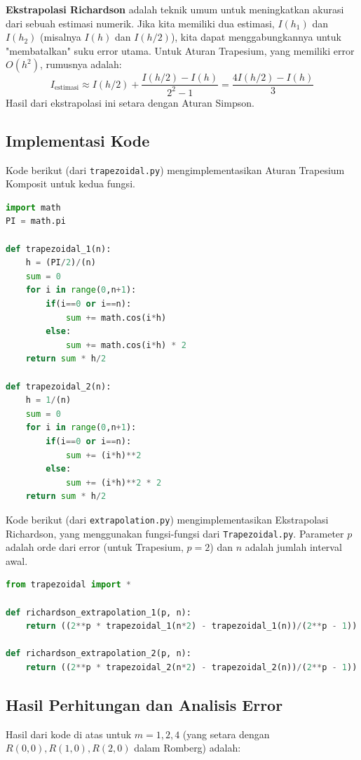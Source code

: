 \documentclass[a4paper, 11pt]{article} %
\begin{document}
\textbf{Ekstrapolasi Richardson} adalah teknik umum untuk meningkatkan akurasi dari sebuah estimasi numerik. %
Jika kita memiliki dua estimasi, $I(h_1)$ dan $I(h_2)$ (misalnya $I(h)$ dan $I(h/2)$), kita dapat menggabungkannya untuk "membatalkan" suku error utama. %
Untuk Aturan Trapesium, yang memiliki error $O(h^2)$, rumusnya adalah: %
\[ I_{\text{estimasi}} \approx I(h/2) + \frac{I(h/2) - I(h)}{2^2 - 1} = \frac{4 I(h/2) - I(h)}{3} \] %
Hasil dari ekstrapolasi ini setara dengan Aturan Simpson. %
\subsection{Implementasi Kode} %
Kode berikut (dari \texttt{trapezoidal.py}) mengimplementasikan Aturan Trapesium Komposit untuk kedua fungsi. %

\begin{lstlisting}[language=Python, caption={Fungsi trapezoidal.py}, label=list:trap] % 
import math
PI = math.pi

def trapezoidal_1(n):
    h = (PI/2)/(n)
    sum = 0
    for i in range(0,n+1):
        if(i==0 or i==n):
            sum += math.cos(i*h)
        else:
            sum += math.cos(i*h) * 2
    return sum * h/2

def trapezoidal_2(n):
    h = 1/(n)
    sum = 0
    for i in range(0,n+1):
        if(i==0 or i==n):
            sum += (i*h)**2
        else:
            sum += (i*h)**2 * 2
    return sum * h/2
\end{lstlisting}  

Kode berikut (dari \texttt{extrapolation.py}) mengimplementasikan Ekstrapolasi Richardson, yang menggunakan fungsi-fungsi dari \texttt{Trapezoidal.py}. Parameter $p$ adalah orde dari error (untuk Trapesium, $p=2$) dan $n$ adalah jumlah interval awal. %

\begin{lstlisting}[language=Python, caption={Fungsi extrapolation.py}, label=list:extrap]
from trapezoidal import *

def richardson_extrapolation_1(p, n):
    return ((2**p * trapezoidal_1(n*2) - trapezoidal_1(n))/(2**p - 1))

def richardson_extrapolation_2(p, n):
    return ((2**p * trapezoidal_2(n*2) - trapezoidal_2(n))/(2**p - 1))
\end{lstlisting}

\subsection{Hasil Perhitungan dan Analisis Error} %
Hasil dari kode di atas untuk $m = 1, 2, 4$ (yang setara dengan $R(0,0), R(1,0), R(2,0)$ dalam Romberg) adalah: %
\end{document}
